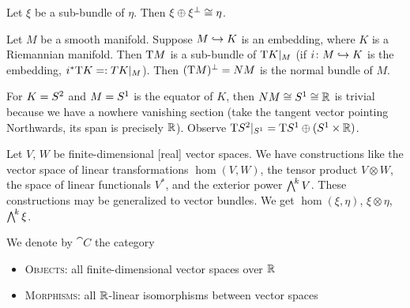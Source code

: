 
\lecture{}

\begin{corollary}
Let $\xi$ be a sub-bundle of $\eta$. Then $\xi\oplus\xi^{\perp}\cong\eta$.
\end{corollary}

\begin{example}
Let $M$ be a smooth manifold. Suppose $M\hookrightarrow K$ is an embedding,
where $K$ is a Riemannian manifold. Then $\mathrm{T} M$ is a sub-bundle of $\mathrm{T} K|_{M}$
(if $i\colon M\hookrightarrow K$ is the embedding, $i^{*}\mathrm{T} K =: TK|_{M}$). Then
$(\mathrm{T} M)^{\perp}=NM$ is the normal bundle of $M$.
\end{example}

\begin{example}
For $K=S^{2}$ and $M=S^{1}$ is the equator of $K$, then
$NM\cong S^{1}\cong\mathbb{R}$ is trivial because we have a nowhere
vanishing section (take the tangent vector pointing Northwards, its
span is precisely $\mathbb{R}$). Observe $\mathrm{T}S^{2}|_{S^{1}}=\mathrm{T}S^{1}\oplus(S^{1}\times\mathbb{R})$.
\end{example}

\begin{node}
Let $V$, $W$ be finite-dimensional [real] vector spaces. We have
constructions like the vector space of linear transformations $\hom(V,W)$,
the tensor product $V\otimes W$,
the space of linear functionals $V^{*}$,
and the exterior power $\extp^{k}V$.
These constructions may be generalized to vector
bundles. We get $\hom(\xi,\eta)$, $\xi\otimes\eta$, $\extp^{k}\xi$.
\end{node}

\begin{notation}
We denote by $\cat{C}$ the category
\begin{itemize}
\item \textsc{Objects}: all finite-dimensional vector spaces over $\mathbb{R}$
\item \textsc{Morphisms}: all $\mathbb{R}$-linear isomorphisms between vector spaces
\end{itemize}
\end{notation}

